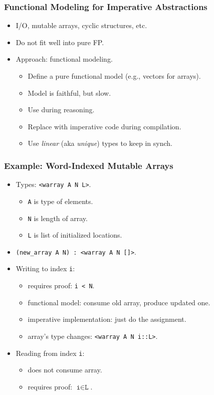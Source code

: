 \documentclass[11pt]{beamer}
\begin{document}
\begin{frame}
\frametitle{Functional Modeling for Imperative Abstractions}

\begin{itemize}
\item I/O, mutable arrays, cyclic structures, etc.
\item Do not fit well into pure FP.
\item Approach: functional modeling.
\begin{itemize}
\item Define a pure functional model (e.g., vectors for arrays).
\item Model is faithful, but slow.
\item Use during reasoning.
\item Replace with imperative code during compilation.
\item Use \emph{linear} (aka \emph{unique}) types to keep in synch.
\end{itemize}
\end{itemize}
\end{frame}

\begin{frame}
\frametitle{Example: Word-Indexed Mutable Arrays}

\begin{itemize}
\item Types: \texttt{<warray A N L>}.
\begin{itemize}
\item \texttt{A} is type of elements.
\item \texttt{N} is length of array.
\item \texttt{L} is list of initialized locations.
\end{itemize}

\item \texttt{(new\_array A N) : <warray A N []>}.

\item Writing to index \texttt{i}: 
\begin{itemize}
\item requires proof: \texttt{i < N}.
\item functional model: consume old array, produce updated one.
\item imperative implementation: just do the assignment.
\item array's type changes:  \texttt{<warray A N i::L>}.
\end{itemize}

\item Reading from index \texttt{i}:
\begin{itemize}
\item does not consume array.
\item requires proof: $\texttt{i}\in\texttt{L}$.
\end{itemize}
\end{itemize}
\end{frame}
\end{document}
